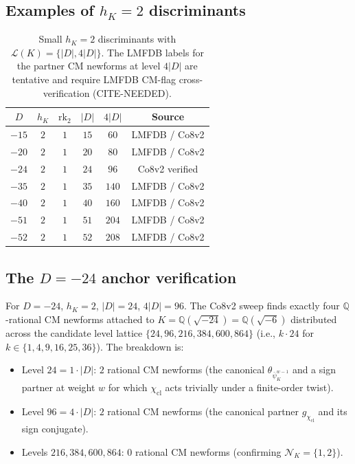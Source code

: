 \documentclass[11pt,a4paper]{amsart}
\theoremstyle{definition}
\newcommand{\Q}{\mathbb{Q}}
\newcommand{\Lcal}{\mathcal{L}}
\newcommand{\Ncal}{\mathcal{N}}
\newcommand{\hK}{h_{K}}
\begin{document}
\subsection{Examples of $h_K = 2$ discriminants}\label{sec:thmB-examples}

\begin{table}[h]
\centering
\caption{Small $\hK = 2$ discriminants with $\Lcal(K) = \{|D|, 4|D|\}$. The LMFDB labels for the partner CM newforms at level $4|D|$ are tentative and require LMFDB CM-flag cross-verification (CITE-NEEDED).}
\label{tab:hK2-examples}
\begin{tabular}{cccccc}
\toprule
$D$ & $\hK$ & $\mathrm{rk}_2$ & $|D|$ & $4|D|$ & Source \\
\midrule
$-15$ & $2$ & $1$ & $15$ & $60$ & LMFDB / Co8v2 \\
$-20$ & $2$ & $1$ & $20$ & $80$ & LMFDB / Co8v2 \\
$-24$ & $2$ & $1$ & $24$ & $96$ & Co8v2 verified \\
$-35$ & $2$ & $1$ & $35$ & $140$ & LMFDB / Co8v2 \\
$-40$ & $2$ & $1$ & $40$ & $160$ & LMFDB / Co8v2 \\
$-51$ & $2$ & $1$ & $51$ & $204$ & LMFDB / Co8v2 \\
$-52$ & $2$ & $1$ & $52$ & $208$ & LMFDB / Co8v2 \\
\bottomrule
\end{tabular}
\end{table}

\subsection{The $D = -24$ anchor verification}\label{sec:thmB-D24}

For $D = -24$, $\hK = 2$, $|D| = 24$, $4|D| = 96$. The Co8v2 sweep finds exactly four $\Q$-rational CM newforms attached to $K = \Q(\sqrt{-24}) = \Q(\sqrt{-6})$ distributed across the candidate level lattice $\{24, 96, 216, 384, 600, 864\}$ (i.e., $k \cdot 24$ for $k \in \{1, 4, 9, 16, 25, 36\}$). The breakdown is:
\begin{itemize}[leftmargin=2em]
  \item Level $24 = 1 \cdot |D|$: $2$ rational CM newforms (the canonical $\theta_{\bar\psi_K^{w-1}}$ and a sign partner at weight $w$ for which $\chi_{\mathrm{cl}}$ acts trivially under a finite-order twist).
  \item Level $96 = 4 \cdot |D|$: $2$ rational CM newforms (the canonical partner $g_{\chi_{\mathrm{cl}}}$ and its sign conjugate).
  \item Levels $216, 384, 600, 864$: $0$ rational CM newforms (confirming $\Ncal_K = \{1, 2\}$).
\end{itemize}
\end{document}
